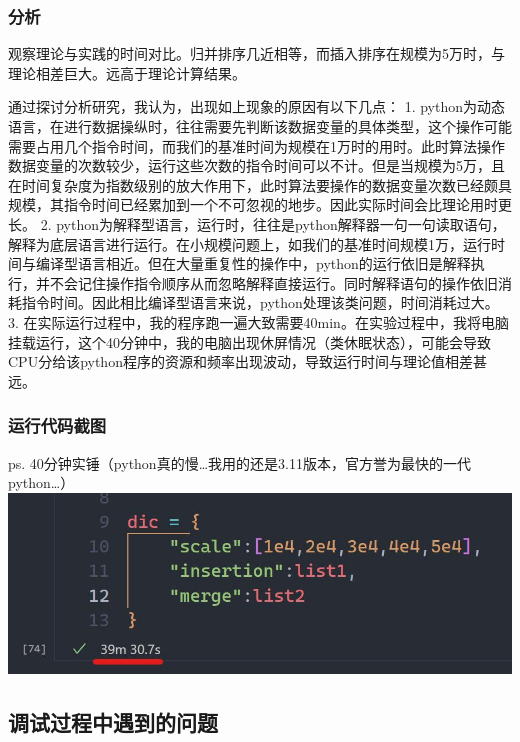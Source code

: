 \documentclass[11pt]{article}
\begin{document}
    \hypertarget{ux5206ux6790}{%
\subsubsection{分析}\label{ux5206ux6790}}

观察理论与实践的时间对比。归并排序几近相等，而插入排序在规模为5万时，与理论相差巨大。远高于理论计算结果。

通过探讨分析研究，我认为，出现如上现象的原因有以下几点： 1.
python为动态语言，在进行数据操纵时，往往需要先判断该数据变量的具体类型，这个操作可能需要占用几个指令时间，而我们的基准时间为规模在1万时的用时。此时算法操作数据变量的次数较少，运行这些次数的指令时间可以不计。但是当规模为5万，且在时间复杂度为指数级别的放大作用下，此时算法要操作的数据变量次数已经颇具规模，其指令时间已经累加到一个不可忽视的地步。因此实际时间会比理论用时更长。
2.
python为解释型语言，运行时，往往是python解释器一句一句读取语句，解释为底层语言进行运行。在小规模问题上，如我们的基准时间规模1万，运行时间与编译型语言相近。但在大量重复性的操作中，python的运行依旧是解释执行，并不会记住操作指令顺序从而忽略解释直接运行。同时解释语句的操作依旧消耗指令时间。因此相比编译型语言来说，python处理该类问题，时间消耗过大。
3.
在实际运行过程中，我的程序跑一遍大致需要40min。在实验过程中，我将电脑挂载运行，这个40分钟中，我的电脑出现休屏情况（类休眠状态），可能会导致CPU分给该python程序的资源和频率出现波动，导致运行时间与理论值相差甚远。

    \hypertarget{ux8fd0ux884cux4ee3ux7801ux622aux56fe}{%
\subsubsection{运行代码截图}\label{ux8fd0ux884cux4ee3ux7801ux622aux56fe}}

ps.
40分钟实锤（python真的慢\ldots 我用的还是3.11版本，官方誉为最快的一代python\ldots）
\includegraphics{./lab_1_files/1.jpg}

    \hypertarget{ux8c03ux8bd5ux8fc7ux7a0bux4e2dux9047ux5230ux7684ux95eeux9898}{%
\subsection{调试过程中遇到的问题}\label{ux8c03ux8bd5ux8fc7ux7a0bux4e2dux9047ux5230ux7684ux95eeux9898}}
\end{document}
